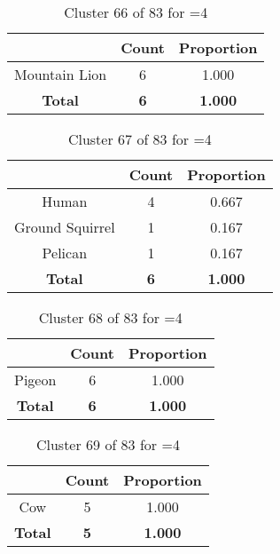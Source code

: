 \begin{table}[ht!]
\centering
\begin{tabular}{|c|c|c|}
\hline
\bf \Spec{} &\bf Count &\bf Proportion\\ \hline \hline
Mountain Lion & 6 & 1.000\\ \hline
\hline
\bf Total & \bf 6 & \bf 1.000\\ \hline
\end{tabular}
\label{tab:cluster:66:4}
\caption{Cluster 66 of 83 for \minneigh{}=4}
\end{table}

\begin{table}[ht!]
\centering
\begin{tabular}{|c|c|c|}
\hline
\bf \Spec{} &\bf Count &\bf Proportion\\ \hline \hline
Human & 4 & 0.667\\ \hline
Ground Squirrel & 1 & 0.167\\ \hline
Pelican & 1 & 0.167\\ \hline
\hline
\bf Total & \bf 6 & \bf 1.000\\ \hline
\end{tabular}
\label{tab:cluster:67:4}
\caption{Cluster 67 of 83 for \minneigh{}=4}
\end{table}

\begin{table}[ht!]
\centering
\begin{tabular}{|c|c|c|}
\hline
\bf \Spec{} &\bf Count &\bf Proportion\\ \hline \hline
Pigeon & 6 & 1.000\\ \hline
\hline
\bf Total & \bf 6 & \bf 1.000\\ \hline
\end{tabular}
\label{tab:cluster:68:4}
\caption{Cluster 68 of 83 for \minneigh{}=4}
\end{table}

\begin{table}[ht!]
\centering
\begin{tabular}{|c|c|c|}
\hline
\bf \Spec{} &\bf Count &\bf Proportion\\ \hline \hline
Cow & 5 & 1.000\\ \hline
\hline
\bf Total & \bf 5 & \bf 1.000\\ \hline
\end{tabular}
\label{tab:cluster:69:4}
\caption{Cluster 69 of 83 for \minneigh{}=4}
\end{table}

